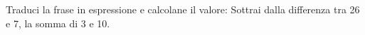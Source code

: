\item Traduci la frase in espressione e calcolane il valore: Sottrai dalla differenza tra 26 e 7, la somma di 3 e 10.